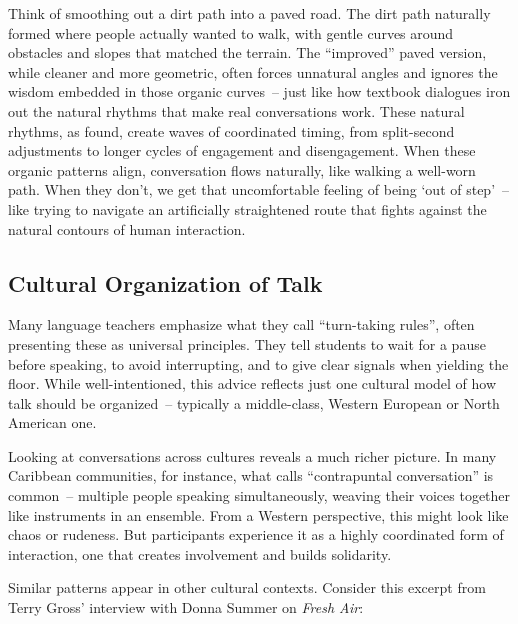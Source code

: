 Think of smoothing out a dirt path into a paved road. The dirt path naturally formed where people actually wanted to walk, with gentle curves around obstacles and slopes that matched the terrain. The ``improved'' paved version, while cleaner and more geometric, often forces unnatural angles and ignores the wisdom embedded in those organic curves~-- just like how textbook dialogues iron out the natural rhythms that make real conversations work. These natural rhythms, as \citet{wilson2005} found, create waves of coordinated timing, from split-second adjustments to longer cycles of engagement and disengagement. When these organic patterns align, conversation flows naturally, like walking a well-worn path. When they don't, we get that uncomfortable feeling of being `out of step'~-- like trying to navigate an artificially straightened route that fights against the natural contours of human interaction.

\subsection{Cultural Organization of Talk} \label{subsec:cultural-org}

Many language teachers emphasize what they call ``turn-taking rules'', often presenting these as universal principles. They tell students to wait for a pause before speaking, to avoid interrupting, and to give clear signals when yielding the floor. While well-intentioned, this advice reflects just one cultural model of how talk should be organized~-- typically a middle-class, Western European or North American one.

Looking at conversations across cultures reveals a much richer picture. In many Caribbean communities, for instance, what \citet{reisman1974} calls ``contrapuntal conversation'' is common~-- multiple people speaking simultaneously, weaving their voices together like instruments in an ensemble. From a Western perspective, this might look like chaos or rudeness. But participants experience it as a highly coordinated form of interaction, one that creates involvement and builds solidarity.

Similar patterns appear in other cultural contexts. Consider this excerpt from Terry Gross' interview with Donna Summer on \textit{Fresh Air}:

